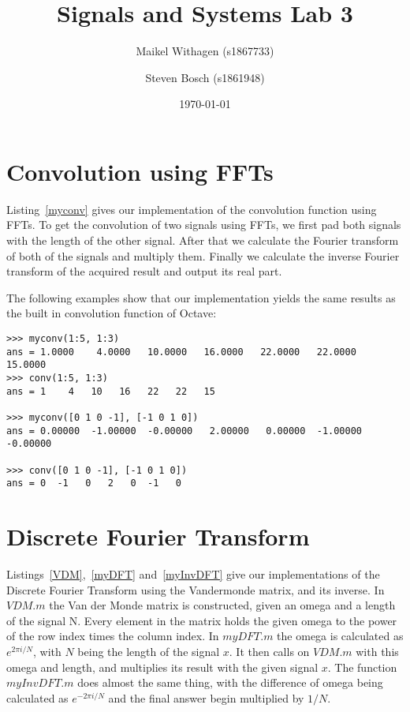 \documentclass{article}
\title{Signals and Systems Lab 3}
\author{Maikel Withagen (s1867733) \and Steven Bosch (s1861948)}
\date{\today}
\begin{document}
\maketitle

\section{Convolution using FFTs}
Listing~\ref{myconv} gives our implementation of the convolution function using FFTs. To get the convolution of two signals using FFTs, we first pad both signals with the length of the other signal. After that we calculate the Fourier transform of both of the signals and multiply them. Finally we calculate the inverse Fourier transform of the acquired result and output its real part.

The following examples show that our implementation yields the same results as the built in convolution function of Octave:
\begin{lstlisting}
>>> myconv(1:5, 1:3)
ans = 1.0000    4.0000   10.0000   16.0000   22.0000   22.0000   15.0000
>>> conv(1:5, 1:3)
ans = 1    4   10   16   22   22   15

>>> myconv([0 1 0 -1], [-1 0 1 0])
ans = 0.00000  -1.00000  -0.00000   2.00000   0.00000  -1.00000  -0.00000

>>> conv([0 1 0 -1], [-1 0 1 0])
ans = 0  -1   0   2   0  -1   0
\end{lstlisting}

 

\section{Discrete Fourier Transform}
Listings~\ref{VDM},~\ref{myDFT} and~\ref{myInvDFT} give our implementations of the Discrete Fourier Transform using the Vandermonde matrix, and its inverse. In $VDM.m$ the Van der Monde matrix is constructed, given an omega and a length of the signal N. Every element in the matrix holds the given omega to the power of the row index times the column index. In $myDFT.m$ the omega is calculated as $e^{2\pi i/N}$, with $N$ being the length of the signal $x$. It then calls on $VDM.m$ with this omega and length, and multiplies its result with the given signal $x$. The function $myInvDFT.m$ does almost the same thing, with the difference of omega being calculated as $e^{-2\pi i/N}$ and the final answer begin multiplied by $1/N$.
\end{document}
